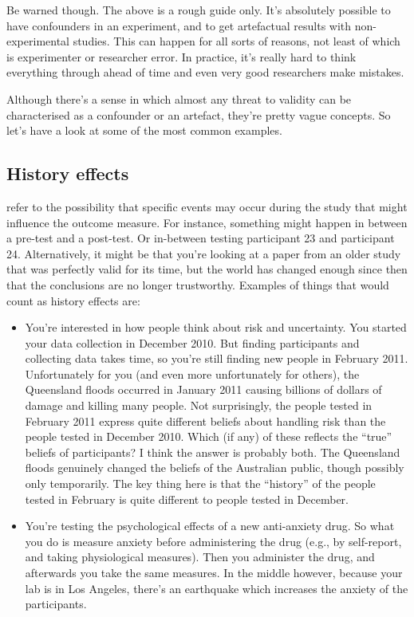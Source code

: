Be warned though. The above is a rough guide only. It's absolutely possible to have confounders in an experiment, and to get artefactual results with non-experimental studies. This can happen for all sorts of reasons, not least of which is experimenter or researcher error. In practice, it's really hard to think everything through ahead of time and even very good researchers make mistakes. 

Although there's a sense in which almost any threat to validity can be characterised as a confounder or an artefact, they're pretty vague concepts. So let's have a look at some of the most common examples.

\subsection{History effects}

 refer to the possibility that specific events may occur during the study that might influence the outcome measure. For instance, something might happen in between a pre-test and a post-test. Or in-between testing participant 23 and participant 24. Alternatively, it might be that you're looking at a paper from an older study that was perfectly valid for its time, but the world has changed enough since then that the conclusions are no longer trustworthy. Examples of things that would count as history effects are:

\begin{itemize}
\item You're interested in how people think about risk and uncertainty. You started your data collection in December 2010. But finding participants and collecting data takes time, so you're still finding new people in February 2011. Unfortunately for you (and even more unfortunately for others), the Queensland floods occurred in January 2011 causing billions of dollars of damage and killing many people. Not surprisingly, the people tested in February 2011 express quite different beliefs about handling risk than the people tested in December 2010. Which (if any) of these reflects the ``true'' beliefs of participants? I think the answer is probably both. The Queensland floods genuinely changed the beliefs of the Australian public, though possibly only temporarily. The key thing here is that the ``history'' of the people tested in February is quite different to people tested in December. 
\item You're testing the psychological effects of a new anti-anxiety drug. So what you do is measure anxiety before administering the drug (e.g., by self-report, and taking physiological measures). Then you administer the drug, and afterwards you take the same measures. In the middle however, because your lab is in Los Angeles, there's an earthquake which increases the anxiety of the participants.  
\end{itemize}

